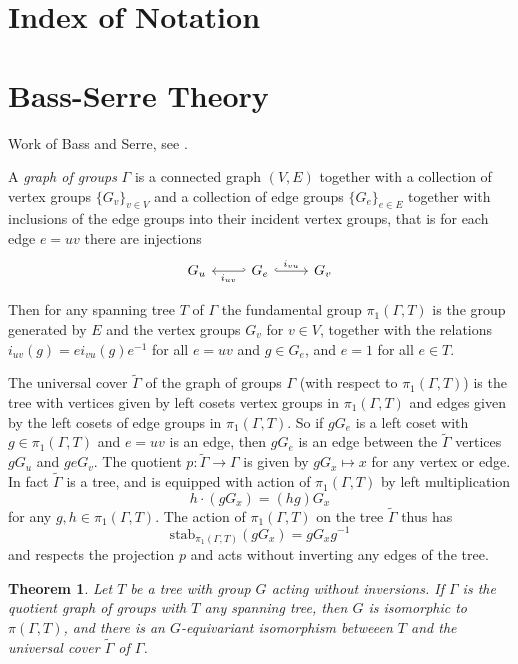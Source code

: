 \documentclass[11pt]{article}
\newtheorem{theorem}{Theorem}
\theoremstyle{remark}
\theoremstyle{definition}
\begin{document}
\section{Index of Notation}

\section{Bass-Serre Theory}

Work of Bass and Serre, see \cite{SerreJeanPierre2003T}.

A \emph{graph of groups} $\Gamma$
is a connected graph $(V,E)$ together with
a collection of vertex groups $\{G_v\}_{v \in V}$
and a collection of edge groups $\{G_e\}_{e \in E}$
together with inclusions of the edge groups into their incident vertex groups, that is for each edge $e=uv$ there are injections
$$
\begin{tikzcd}
G_u & G_e \arrow[l,hook',"i_{uv}"] \arrow[r,hook,"i_{vu}"] & G_v
\end{tikzcd}
$$

Then for any spanning tree $T$ of $\Gamma$
the fundamental group $\pi_1(\Gamma,T)$
is the group generated by $E$ and the vertex groups $G_v$ for $v \in V$,
together with the relations
$i_{uv}(g) = e i_{vu}(g) e^{-1}$ for all $e=uv$
and $g \in G_e$,
and $e=1$ for all $e \in T$.

The universal cover $\tilde \Gamma$ of the graph of groups $\Gamma$ (with respect to $\pi_1(\Gamma, T)$) is the tree
with vertices
given by left cosets vertex groups in $\pi_1(\Gamma, T)$
and edges given by the left cosets of edge groups in $\pi_1(\Gamma, T)$.
So if $gG_e$ is a left coset with $g \in \pi_1(\Gamma, T)$
and $e=uv$ is an edge, then
$gG_e$ is an edge
between the $\tilde \Gamma$ vertices $gG_u$ and $geG_v$.
The quotient $p: \tilde \Gamma \to \Gamma$
is given by $gG_x \mapsto x$ for any vertex or edge.
In fact $\tilde \Gamma$ is a tree,
and is
equipped with
action
of $\pi_1(\Gamma, T)$ by left multiplication
$$
h \cdot \left ( gG_x \right) = (hg) G_x
$$
for any $g,h \in \pi_1(\Gamma, T)$.
The action of $\pi_1(\Gamma, T)$ on the tree
$\tilde \Gamma$ thus has
$$
\mbox{stab}_{\pi_1(\Gamma, T)} \left ( gG_x \right )
=
gG_xg^{-1}
$$
and respects the projection $p$ and acts without inverting any edges of the tree.

\begin{theorem}
  Let $T$ be a tree with group $G$ acting without inversions. If $\Gamma$ is the quotient graph of groups with $T$ any spanning tree,
  then $G$ is isomorphic to $\pi(\Gamma, T)$,
  and there is an $G$-equivariant isomorphism betweeen $T$ and the universal cover $\tilde \Gamma$ of $\Gamma$.
  \label{thm:bassserre}
\end{theorem}
\end{document}
